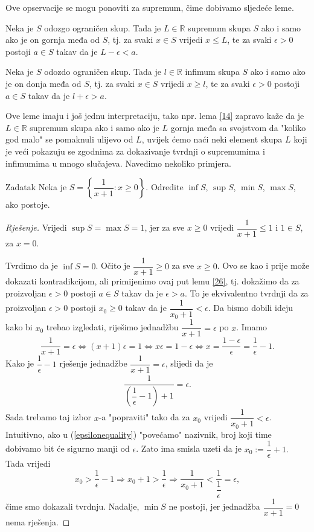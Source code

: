Ove opservacije se mogu ponoviti za supremum, čime dobivamo sljedeće leme.
\begin{lemma}
\label{14}
Neka je \(S\) odozgo ograničen skup. Tada je \(L\in \mathbb{R}\) supremum skupa \(S\) ako i samo ako je on gornja međa od \(S\), tj. za svaki \(x\in S\) vrijedi \(x\leq L\), te za svaki \(\epsilon >0\) postoji \(a\in S\) takav da je \(L-\epsilon<a\).
\end{lemma}
\begin{lemma}
\label{26}
Neka je \(S\) odozdo ograničen skup. Tada je \(l\in \mathbb{R}\) infimum skupa \(S\) ako i samo ako je on donja međa od \(S\), tj. za svaki \(x\in S\) vrijedi \(x\geq l\), te za svaki \(\epsilon >0\) postoji \(a\in S\) takav da je \(l+\epsilon>a\).
\end{lemma}
Ove leme imaju i još jednu interpretaciju, tako npr. lema \ref{14} zapravo kaže da je $L\in \mathbb{R}$ supremum skupa ako i samo ako je $L$ gornja međa sa svojstvom da "koliko god malo" se pomaknuli ulijevo od $L$, uvijek ćemo naći neki element skupa $L$ koji je veći pokazuju se zgodnima za dokazivanje tvrdnji o supremumima i infimumima u mnogo slučajeva. Navedimo nekoliko primjera.
\begin{exercise}{Zadatak}
Neka je $S=\left\{\dfrac{1}{x+1} : x\geq 0\right\}$. Odredite $\inf{S}$, $\sup{S}$, $\min{S}$, $\max{S}$, ako postoje.
\end{exercise}
\begin{proof}[Rješenje]
Vrijedi $\sup{S}=\max{S}=1$, jer za sve $x\geq 0$ vrijedi $\dfrac{1}{x+1}\leq 1$ i $1\in S$, za $x=0$.

Tvrdimo da je $\inf{S}=0$. Očito je $\dfrac{1}{x+1}\geq 0$ za sve $x\geq 0$. Ovo se kao i prije može dokazati kontradikcijom, ali primijenimo ovaj put lemu \ref{26}, tj. dokažimo da za proizvoljan \(\epsilon>0\) postoji \(a\in S\) takav da je \(\epsilon>a\). To je ekvivalentno tvrdnji da za proizvoljan \(\epsilon>0\) postoji \(x_0\geq 0\) takav da je \(\dfrac{1}{x_0+1}<\epsilon.\) Da bismo dobili ideju kako bi \(x_0\) trebao izgledati, riješimo jednadžbu \(\dfrac{1}{x+1}=\epsilon\) po \(x\). Imamo
\[\dfrac{1}{x+1}=\epsilon \Leftrightarrow (x+1)\epsilon=1\Leftrightarrow x\epsilon=1-\epsilon\Leftrightarrow x=\dfrac{1-\epsilon}{\epsilon}=\dfrac{1}{\epsilon}-1.\]
Kako je \(\dfrac{1}{\epsilon}-1\) rješenje jednadžbe \(\dfrac{1}{x+1}=\epsilon\), slijedi da je 
\begin{align}
\label{epsilonequality}
\dfrac{1}{\left(\dfrac{1}{\epsilon}-1\right)+1}=\epsilon.
\end{align}
Sada trebamo taj izbor \(x\)-a "popraviti" tako da za \(x_0\) vrijedi \(\dfrac{1}{x_0+1}<\epsilon\). Intuitivno, ako u (\ref{epsilonequality}) "povećamo" nazivnik, broj koji time dobivamo bit će sigurno manji od \(\epsilon\). Zato ima smisla uzeti da je \(x_0:=\dfrac{1}{\epsilon}+1.\) Tada vrijedi
\[x_0>\dfrac{1}{\epsilon}-1\Rightarrow x_0+1>\dfrac{1}{\epsilon}\Rightarrow \dfrac{1}{x_0+1}<\dfrac{1}{\dfrac{1}{\epsilon}}=\epsilon,\]
čime smo dokazali tvrdnju. Nadalje, $\min{S}$ ne postoji, jer jednadžba $\dfrac{1}{x+1}=0$ nema rješenja.
\end{proof}
